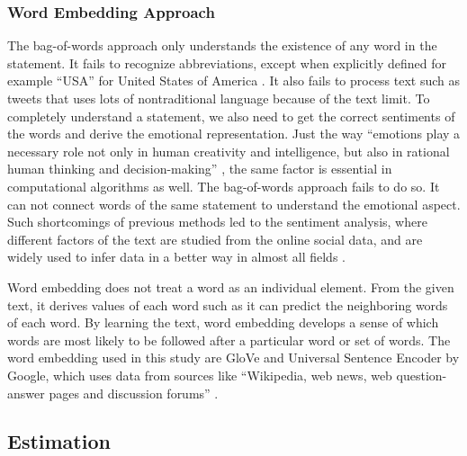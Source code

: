 \documentclass[12pt]{article}
\begin{document}
\subsubsection{Word Embedding Approach}
The bag-of-words approach only understands the existence of any word in the statement. It fails to recognize abbreviations, except when explicitly defined for example ``USA'' for United States of America \parencites{kenter2015short}. It also fails to process text such as tweets that uses lots of nontraditional language because of the text limit. To completely understand a statement, we also need to get the correct sentiments of the words and derive the emotional representation. Just the way ``emotions play a necessary role not
only in human creativity and intelligence, but also in rational human thinking and decision-making'' \parencites[14]{picard1995affective}, the same factor is essential in computational algorithms as well. The bag-of-words approach fails to do so. It can not connect words of the same statement to understand the emotional aspect. Such shortcomings of previous methods led to the sentiment analysis, where different factors of the text are studied from the online social data, and are widely used to infer data in a better way in almost all fields \parencites{cambria2016affective}.

Word embedding does not treat a word as an individual element. From the given text, it derives values of each word such as it can predict the neighboring words of each word. By learning the text, word embedding develops a sense of which words are most likely to be followed after a particular word or set of words. The word embedding used in this study are GloVe \parencites{pennington2014glove} and Universal Sentence Encoder by Google, which uses data from sources like ``Wikipedia, web news,
web question-answer pages and discussion forums''  \parencites{cer2018universal}. 



\subsection{Estimation}
\end{document}
